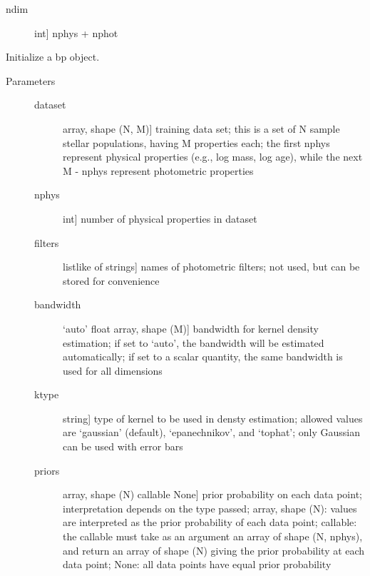\documentclass[letterpaper,10pt,english]{sphinxmanual}
\begin{document}
\begin{fulllineitems}
\begin{description}
\begin{description}
\item[{ndim}] \leavevmode{[}int{]}
nphys + nphot

\end{description}

\end{description}

\begin{fulllineitems}
\label{bayesphot:slugpy.bayesphot.bp.bp.__init__}
Initialize a bp object.
\begin{description}
\item[{Parameters}] \leavevmode\begin{description}
\item[{dataset}] \leavevmode{[}array, shape (N, M){]}
training data set; this is a set of N sample stellar
populations, having M properties each; the first nphys
represent physical properties (e.g., log mass, log age),
while the next M - nphys represent photometric
properties

\item[{nphys}] \leavevmode{[}int{]}
number of physical properties in dataset

\item[{filters}] \leavevmode{[}listlike of strings{]}
names of photometric filters; not used, but can be
stored for convenience

\item[{bandwidth}] \leavevmode{[}`auto' \textbar{} float \textbar{} array, shape (M){]}
bandwidth for kernel density estimation; if set to
`auto', the bandwidth will be estimated automatically; if
set to a scalar quantity, the same bandwidth is used for all
dimensions

\item[{ktype}] \leavevmode{[}string{]}
type of kernel to be used in densty estimation; allowed
values are `gaussian' (default), `epanechnikov', and
`tophat'; only Gaussian can be used with error bars

\item[{priors}] \leavevmode{[}array, shape (N) \textbar{} callable \textbar{} None{]}
prior probability on each data point; interpretation
depends on the type passed; array, shape (N): values are
interpreted as the prior probability of each data point;
callable: the callable must take as an argument an array
of shape (N, nphys), and return an array of shape (N)
giving the prior probability at each data point; None:
all data points have equal prior probability


\end{description}
\end{description}
\end{fulllineitems}
\end{fulllineitems}
\end{document}
